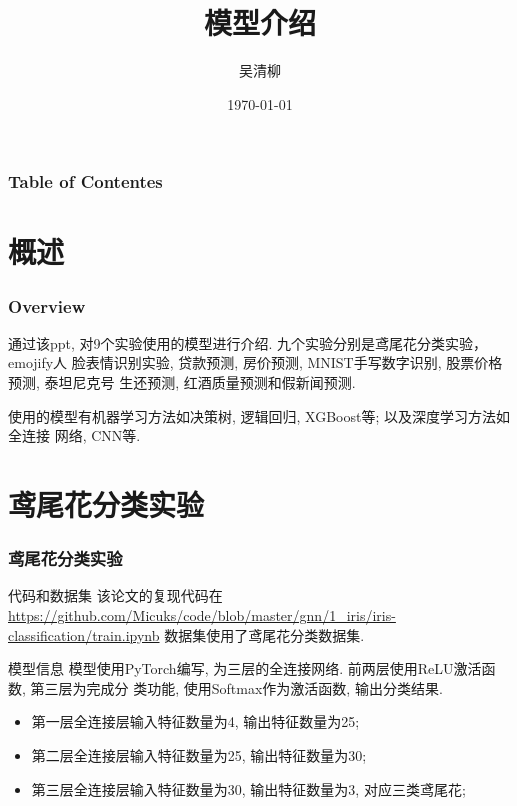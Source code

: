 \documentclass{beamer}
\title{模型介绍}
\author{吴清柳}
\institute{Beijing University of Posts and Telecommunications}
\date{\today}
\begin{document}
\AtBeginSection{\tableofcontents[currentsection]}
\maketitle

\begin{frame}
	\frametitle{Table of Contentes}
	\tableofcontents
\end{frame}

\section{概述}
\begin{frame}
	\frametitle{Overview}
	通过该ppt, 对9个实验使用的模型进行介绍. 九个实验分别是鸢尾花分类实验，emojify人
	脸表情识别实验, 贷款预测, 房价预测, MNIST手写数字识别, 股票价格预测, 泰坦尼克号
	生还预测, 红酒质量预测和假新闻预测.

	使用的模型有机器学习方法如决策树, 逻辑回归, XGBoost等; 以及深度学习方法如全连接
	网络, CNN等.
\end{frame}

\section{鸢尾花分类实验}
\begin{frame}[fragile]
	\frametitle{鸢尾花分类实验}
	\begin{block}{代码和数据集}
		该论文的复现代码在\href{这里}{https://github.com/Micuks/code/blob/master/gnn/1\_iris/iris-classification/train.ipynb}
		数据集使用了鸢尾花分类数据集.
	\end{block}

	\begin{block}{模型信息}
		模型使用PyTorch编写, 为三层的全连接网络. 前两层使用ReLU激活函数, 第三层为完成分
		类功能, 使用Softmax作为激活函数, 输出分类结果.
		\begin{itemize}
			\item 第一层全连接层输入特征数量为4, 输出特征数量为25;
			\item 第二层全连接层输入特征数量为25, 输出特征数量为30;
			\item 第三层全连接层输入特征数量为30, 输出特征数量为3, 对应三类鸢尾花;
		\end{itemize}
	\end{block}
\end{frame}
\end{document}
